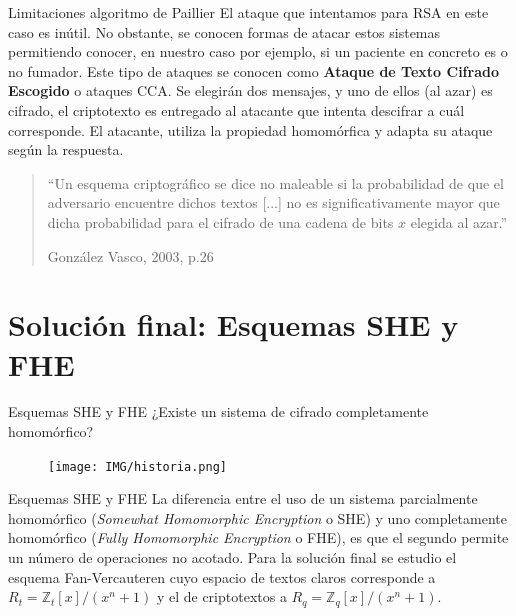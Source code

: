 \documentclass{beamer}
\begin{document}
\begin{frame}{Limitaciones algoritmo de Paillier}
El ataque que intentamos para RSA en este caso es inútil. No obstante, se conocen formas de atacar estos sistemas permitiendo conocer, en nuestro caso por ejemplo, si un paciente en concreto es o no fumador. Este tipo de ataques se conocen como \textbf{Ataque de Texto Cifrado Escogido} o ataques CCA. Se elegirán dos mensajes, y uno de ellos (al azar) es cifrado, el criptotexto es entregado al atacante que intenta descifrar a cuál corresponde. El atacante, utiliza la propiedad homomórfica y adapta su ataque según la respuesta.
\newline
\newline
\begin{quote}
    ``Un esquema criptográfico se dice no maleable si la probabilidad de que el adversario encuentre dichos textos [...] no es significativamente mayor que dicha probabilidad para el cifrado de una cadena de bits $ x $ elegida al azar.'' \begin{flushright}
        González Vasco, 2003, p.26
    \end{flushright}
\end{quote}
\end{frame}

\section{Solución final: Esquemas SHE y FHE}
    \begin{frame}{Esquemas SHE y FHE}
\Large{¿Existe un sistema de cifrado completamente homomórfico?}        \begin{figure}[H]
    	\centering
		\texttt{[image: IMG/historia.png]}
	\end{figure}
    \end{frame}

\begin{frame}{Esquemas SHE y FHE}
La diferencia entre el uso de un sistema parcialmente homomórfico (\textit{Somewhat Homomorphic Encryption} o SHE) y uno completamente homomórfico (\textit{Fully Homomorphic Encryption} o FHE), es que el segundo permite un número de operaciones no acotado. 
\newline
\newline
Para la solución final se estudio el esquema Fan-Vercauteren cuyo espacio de textos claros corresponde a $ R_t = \mathbb{Z}_t [x]/(x^n + 1) $ y el de criptotextos a $ R_q = \mathbb{Z}_q [x]/(x^n + 1) $.  
\end{frame}
\end{document}
